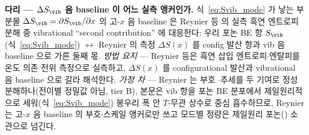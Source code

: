 
\begin{srcbox}
\textbf{다리 --- $\Delta S_\vib$ 음 baseline 이 어느 실측 앵커인가.} 식~\eqref{eq:Svib_mode} 가 낳는 부분몰
$\Delta S_\vib=\partial S_\vib/\partial x$ 의 고-$x$ 음 baseline 은 Reynier 등\cite{reynier2003} 의 실측 흑연
엔트로피 분해 중 vibrational ``second contribution'' 에 대응한다: 우리 포논 BE 항 $S_\vib$(식~\eqref{eq:Svib_mode})
$\leftrightarrow$ Reynier 의 측정 $\Delta S(x)$ 를 config 발산 항과 vib 음 baseline 으로 가른 둘째 몫.
\emph{방법 요지} --- Reynier 등은 흑연 삽입 엔트로피$\cdot$엔탈피를 온도 의존 전위 측정으로 실측하고, $\Delta
S(x)$ 를 configurational 발산과 vibrational 음 baseline 으로 갈라 해석한다. \emph{가정 차} --- Reynier 는 부호
$\cdot$추세를 두 기여로 정성 분해하나(전이별 정밀값 아님, tier B), 본문은 vib 항을 포논 BE 분포에서
제일원리적으로 세워(식~\eqref{eq:Svib_mode}) 봉우리 폭 안 $T$-무관 상수로 중심 흡수하므로, Reynier 는 고-$x$
음 baseline 의 부호$\cdot$스케일 앵커로만 쓰고 모드별 정량은 제일원리 포논(\cite{jpcc2021}) 소관으로 넘긴다.
\end{srcbox}
